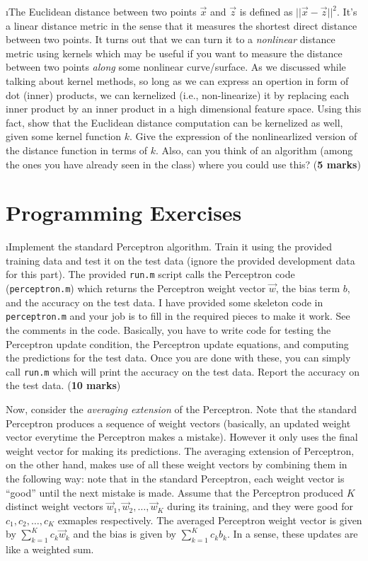 \documentclass[fleqn]{article}
\begin{document}
\i The Euclidean distance between two points $\vec{x}$ and $\vec{z}$ is 
defined as  $||\vec{x}-\vec{z}||^2$. It's a linear distance
metric in the sense that it measures the shortest direct distance between
two points. It turns out that we can turn it to a \textit{nonlinear} distance metric
using kernels which may be useful if you want to measure the distance between
two points \textit{along} some nonlinear curve/surface. As we discussed 
while talking about kernel methods, so long as we can express an opertion in 
form of dot (inner) products, we can kernelized (i.e., non-linearize) it by
replacing each inner product by an inner product in a high dimensional feature
space. Using this fact, show that the Euclidean distance computation can be 
kernelized as well, given some kernel function $k$. Give the expression
of the nonlinearlized version of the distance function in terms of $k$. 
Also, can you think of an algorithm (among the ones you have already seen in the
class) where you could use this? (\textbf{5 marks})

\ene

\section{Programming Exercises}

\bee

\i Implement the standard Perceptron algorithm. Train it using
the provided training data and test it on the test data (ignore
the provided development data for this part). The provided
\texttt{run.m} script calls the Perceptron code (\texttt{perceptron.m}) 
which returns the Perceptron weight vector $\vec{w}$, the bias term 
$b$, and the accuracy on the test data. I have provided some skeleton code 
in \texttt{perceptron.m} and your job is to fill in the required 
pieces to make it work. See the comments in the code. Basically, you 
have to write code for testing the Perceptron update condition, the 
Perceptron update equations, and computing the predictions for the test 
data. Once you are done with these, you can simply call \texttt{run.m} 
which will print the accuracy on the test data. Report the accuracy on
the test data. (\textbf{10 marks})

Now, consider the \textit{averaging extension} of the Perceptron. Note that
the standard Perceptron produces a sequence of weight vectors
(basically, an updated weight vector everytime the Perceptron makes a mistake).
However it only uses the final weight vector for making its predictions.
The averaging extension of Perceptron, on the other hand, makes use of all these
weight vectors by combining them in the following way:
note that in the standard Perceptron, each weight vector is ``good'' until 
the next mistake is made. Assume that the Perceptron produced $K$ distinct 
weight vectors $\vec{w}_1,\vec{w}_2,\ldots,\vec{w}_K$ during its training, 
and they were good for $c_1,c_2,\ldots, c_K$ exmaples respectively. The 
averaged Perceptron weight vector is given by $\sum_{k=1}^K c_k \vec{w}_k$ 
and the bias is given by $\sum_{k=1}^K c_k b_k$. In a sense, these updates
are like a weighted sum.
\end{document}
